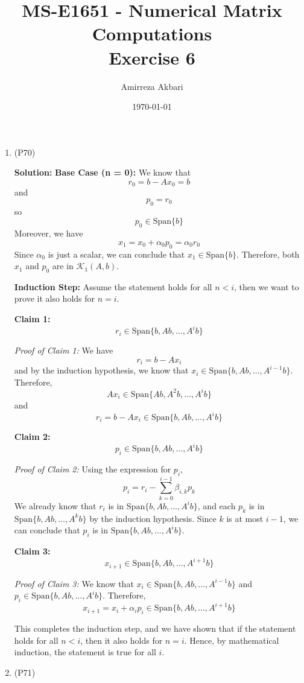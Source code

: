 \documentclass{article}
\title{MS-E1651 - Numerical Matrix Computations
\\Exercise 6}
\author{Amirreza Akbari}
\date{\today}
\begin{document}
\maketitle
\begin{enumerate}[leftmargin=\labelsep]
	\item (P70)
	
	\textbf{Solution:}
		\textbf{Base Case (n = 0):}
		We know that
		\[r_0 = b - Ax_0 = b\]
		and
		\[p_0 = r_0\]
		so
		\[p_0 \in \text{Span}\{b\}\]
		Moreover, we have
		\[x_1 = x_0 + \alpha_0 p_0 = \alpha_0 r_0\]
		Since \(\alpha_0\) is just a scalar, we can conclude that \(x_1 \in \text{Span}\{b\}\). Therefore, both \(x_1\) and \(p_0\) are in \(\mathcal{K}_1(A, b)\).
		
		\textbf{Induction Step:}
		Assume the statement holds for all \(n < i\), then we want to prove it also holds for \(n = i\).
		
		\textbf{Claim 1:}
		\[r_i \in \text{Span}\{b, Ab, \ldots, A^ib\}\]
		
		\textit{Proof of Claim 1:}
		We have
		\[r_i = b - Ax_i\]
		and by the induction hypothesis, we know that \(x_i \in \text{Span}\{b, Ab, \ldots, A^{i-1}b\}\). Therefore,
		\[Ax_i \in \text{Span}\{Ab, A^2b, \ldots, A^ib\}\]
		and
		\[r_i = b - Ax_i \in \text{Span}\{b, Ab, \ldots, A^ib\}\]
		
		\textbf{Claim 2:}
		\[p_i \in \text{Span}\{b, Ab, \ldots, A^ib\}\]
		
		\textit{Proof of Claim 2:}
		Using the expression for \(p_i\),
		\[p_i = r_i - \sum_{k=0}^{i-1}\beta_{i,k} p_k\]
		We already know that \(r_i\) is in \(\text{Span}\{b, Ab, \ldots, A^ib\}\), and each \(p_k\) is in \(\text{Span}\{b, Ab, \ldots, A^kb\}\) by the induction hypothesis. Since \(k\) is at most \(i-1\), we can conclude that \(p_i\) is in \(\text{Span}\{b, Ab, \ldots, A^ib\}\).
		
		\textbf{Claim 3:}
		\[x_{i+1} \in \text{Span}\{b, Ab, \ldots, A^{i+1}b\}\]
		
		\textit{Proof of Claim 3:}
		We know that \(x_i \in \text{Span}\{b, Ab, \ldots, A^{i-1}b\}\) and \(p_i \in \text{Span}\{b, Ab, \ldots, A^ib\}\). Therefore,
		\[x_{i+1} = x_i + \alpha_i p_i \in \text{Span}\{b, Ab, \ldots, A^{i+1}b\}\]
		
		This completes the induction step, and we have shown that if the statement holds for all \(n < i\), then it also holds for \(n = i\). Hence, by mathematical induction, the statement is true for all \(i\).
		\item (P71)
		

\end{enumerate}
\end{document}

